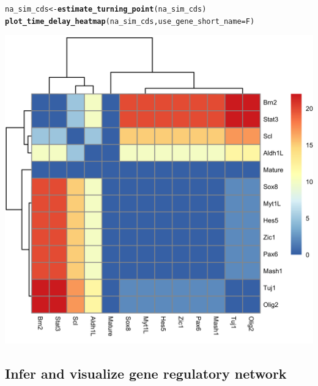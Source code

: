 \documentclass[10pt,oneside]{article}\usepackage[]{graphicx}\usepackage[]{color}
\makeatletter
\def\maxwidth{ %
  \ifdim\Gin@nat@width>\linewidth
    \linewidth
  \else
    \Gin@nat@width
  \fi
}
\newcommand{\hlstd}[1]{\textcolor[rgb]{0.345,0.345,0.345}{#1}}%
\newcommand{\hlkwb}[1]{\textcolor[rgb]{0.69,0.353,0.396}{#1}}%
\newcommand{\hlkwc}[1]{\textcolor[rgb]{0.333,0.667,0.333}{#1}}%
\newcommand{\hlkwd}[1]{\textcolor[rgb]{0.737,0.353,0.396}{\textbf{#1}}}%
\newenvironment{kframe}{%
 \def\at@end@of@kframe{}%
 \ifinner\ifhmode%
  \def\at@end@of@kframe{\end{minipage}}%
  \begin{minipage}{\columnwidth}%
 \fi\fi%
 \def\FrameCommand##1{\hskip\@totalleftmargin \hskip-\fboxsep
 \colorbox{shadecolor}{##1}\hskip-\fboxsep
     \hskip-\linewidth \hskip-\@totalleftmargin \hskip\columnwidth}%
 \MakeFramed {\advance\hsize-\width
   \@totalleftmargin\z@ \linewidth\hsize
   \@setminipage}}%
 {\par\unskip\endMakeFramed%
 \at@end@of@kframe}
\newenvironment{knitrout}{}{} %
\makeatother
\begin{document}
\begin{knitrout}
\color{fgcolor}\begin{kframe}
\begin{alltt}
\hlstd{na_sim_cds} \hlkwb{<-} \hlkwd{estimate_turning_point}\hlstd{(na_sim_cds)}
\hlkwd{plot_time_delay_heatmap}\hlstd{(na_sim_cds,} \hlkwc{use_gene_short_name} \hlstd{= F)}
\end{alltt}


{\ttfamily\noindent\itshape\color{messagecolor}{\#\# There is NA values in turining points calculated, the time delay is set to 0 by default}}\end{kframe}

{\centering \includegraphics[width=\maxwidth]{figure/plot_time_delay_heatmap-1} 

}



\end{knitrout}

\subsection{Infer and visualize gene regulatory network}
\end{document}
